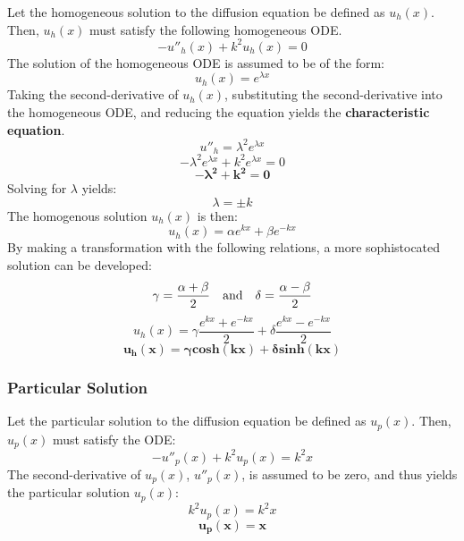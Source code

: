 \documentclass[10pt]{article}		%
\numberwithin{equation}{section}
\begin{document}
Let the homogeneous solution to the diffusion equation be defined as $u_h(x)$. Then, $u_h(x)$ must satisfy the following homogeneous ODE.
\begin{equation}
-u''_h(x) + k^2u_h(x) = 0
\end{equation}
The solution of the homogeneous ODE is assumed to be of the form: 
\begin{equation}
u_h(x) = e^{\lambda x}
\end{equation}
Taking the second-derivative of $u_h(x)$, substituting the second-derivative into the homogeneous ODE, and reducing the equation yields the \textbf{characteristic equation}.
\begin{equation}
u''_h = \lambda^2 e^{\lambda x}
\end{equation}
\begin{equation}
-\lambda^2 e^{\lambda x} + k^2e^{\lambda x} = 0
\end{equation}
\begin{equation}
\mathbf{-\lambda^2 + k^2 = 0}
\end{equation}
Solving for $\lambda$ yields:
\begin{equation}
\lambda = \pm k
\end{equation}
The homogenous solution $u_h(x)$ is then:
\begin{equation}
u_h(x) = \alpha e^{kx} + \beta e^{-kx}
\end{equation}
By making a transformation with the following relations, a more sophistocated solution can be developed:
\begin{equation}
\gamma = \frac{\alpha+\beta}{2} \quad \textnormal{and} \quad \delta = \frac{\alpha-\beta}{2}
\end{equation}
\begin{equation}
u_h(x) = \gamma \frac{e^{kx}+e^{-kx}}{2} + \delta \frac{e^{kx}-e^{-kx}}{2}
\end{equation}
\begin{equation}
\mathbf{u_h(x) = \gamma cosh(kx) + \delta sinh(kx)}
\end{equation}

\subsubsection{Particular Solution}

Let the particular solution to the diffusion equation be defined as $u_p(x)$. Then, $u_p(x)$ must satisfy the ODE:
\begin{equation}
-u''_p(x) + k^2u_p(x) = k^2x
\end{equation}
The second-derivative of $u_p(x)$, $u''_p(x)$, is assumed to be zero, and thus yields the particular solution $u_p(x)$:
\begin{equation}
k^2u_p(x) = k^2x
\end{equation}
\begin{equation}
\mathbf{u_p(x) = x}
\end{equation}
\end{document}
